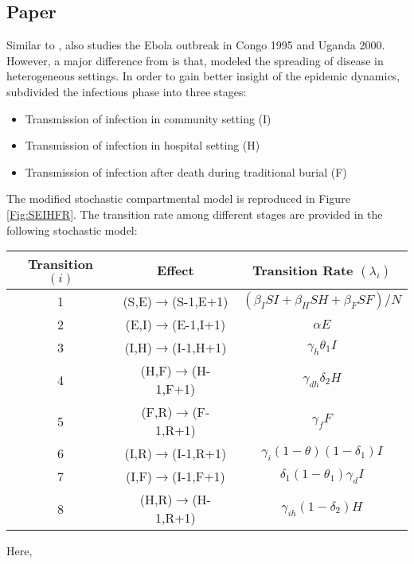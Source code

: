 \documentclass[12pt, journal,onecolumn]{IEEEtran}
\begin{document}
\subsection{Paper \cite{legrand2007understanding}}
Similar to \cite{chowell2004basic}, \cite{legrand2007understanding} also studies the Ebola outbreak in Congo 1995 and Uganda 2000. However, a major difference from \cite{chowell2004basic} is that, \cite{legrand2007understanding} modeled the spreading of disease in heterogeneous settings. In order to gain better insight of the epidemic dynamics, \cite{legrand2007understanding} subdivided the infectious phase into three stages:

\begin{itemize}
\item Transmission of infection in community setting (I)
\item Transmission of infection in hospital setting (H)
\item Transmission of infection after death during traditional burial (F)
\end{itemize}

The modified stochastic compartmental model is reproduced in Figure \ref{Fig:SEIHFR}. The transition rate among different stages are provided in the following stochastic model:

\begin{center}
\begin{tabular}{|c|c|c|}
\hline 
Transition $(i)$ & Effect & Transition Rate $(\lambda_i)$ \tabularnewline
\hline 
\hline 
1 & (S,E)$\to$(S-1,E+1) & $(\beta_{I}SI+\beta_{H}SH+\beta_{F}SF)/N$\tabularnewline
\hline 
2 & (E,I)$\to$(E-1,I+1) & $\alpha E$\tabularnewline
\hline 
3 & (I,H)$\to$(I-1,H+1) & $\gamma_{h}\theta_{1}I$\tabularnewline
\hline 
4 & (H,F)$\to$(H-1,F+1) & $\gamma_{dh}\delta_{2}H$\tabularnewline
\hline 
5 & (F,R)$\to$(F-1,R+1) & $\gamma_{f}F$\tabularnewline
\hline 
6 & (I,R)$\to$(I-1,R+1) & $\gamma_{i}(1-\theta)(1-\delta_{1})I$\tabularnewline
\hline 
7 & (I,F)$\to$(I-1,F+1) & $\delta_{1}(1-\theta_{1})\gamma_{d}I$\tabularnewline
\hline 
8 & (H,R)$\to$(H-1,R+1) & $\gamma_{ih}(1-\delta_{2})H$\tabularnewline
\hline 
\end{tabular}
\end{center}

Here,
\end{document}
